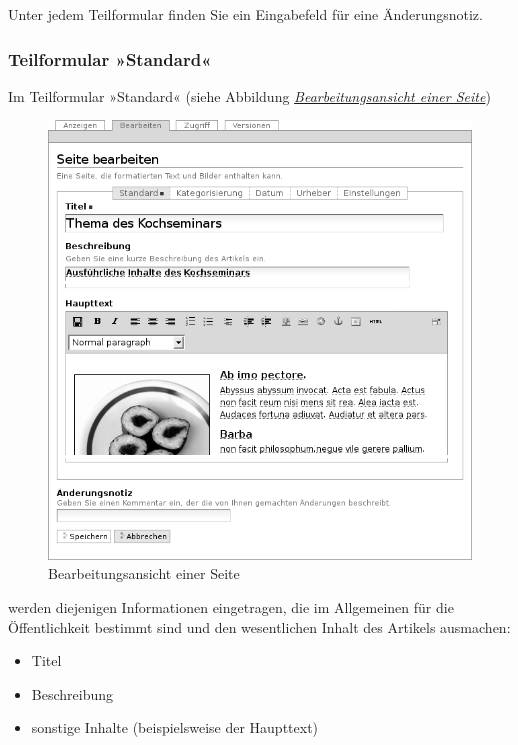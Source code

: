 \documentclass[a4paper,12pt,ngerman]{manual}
\begin{document}
Unter jedem Teilformular finden Sie ein Eingabefeld für eine Änderungsnotiz.


\hypertarget{sec-teilf-stand}{}\subsubsection{Teilformular »Standard«}

Im Teilformular »Standard« (siehe Abbildung \hyperlink{fig-bearbeiten}{\emph{Bearbeitungsansicht einer Seite}})
\hypertarget{fig-bearbeiten}{}\begin{figure}[htbp]
\centering

\includegraphics{seite-bearbeiten-standard.png}
\caption{Bearbeitungsansicht einer Seite}\end{figure}

werden diejenigen Informationen eingetragen, die im Allgemeinen für die
Öffentlichkeit bestimmt sind und den wesentlichen Inhalt des Artikels
ausmachen:
\begin{itemize}
\item {} 
Titel

\item {} 
Beschreibung

\item {} 
sonstige Inhalte (beispielsweise der Haupttext)

\end{itemize}
\end{document}
